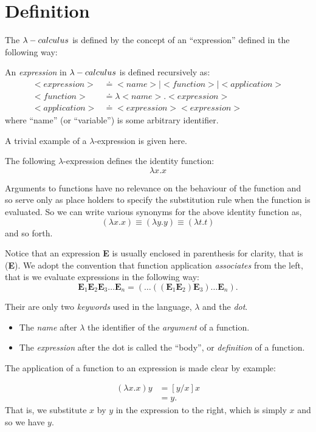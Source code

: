 
\section{Definition} %
\label{sec:definition}

The $\lambda-calculus$ is defined by the concept of an ``expression''
defined in the following way:

\begin{defn}[Expression]
	An \emph{expression} in $\lambda-calculus$ is defined recursively as:
	\begin{align*}
		<expression> & \doteq <name> | <function> | <application>
		\\
		<function> & \doteq \lambda <name>.<expression>
		\\
		<application> & \doteq <expression><expression>
	\end{align*}
	where ``name'' (or ``variable'') is some arbitrary identifier.
\end{defn}

A trivial example of a $\lambda$-expression is given here.

\begin{exmp}
	The following $\lambda$-expression defines the identity function:
	\[
		\lambda x.x
	\]
\end{exmp}

Arguments to functions have no relevance on the behaviour of the function
and so serve only as place holders to specify the substitution rule
when the function is evaluated. So we can write various synonyms for
the above identity function as,
\[
	(\lambda x.x) \equiv (\lambda y.y) \equiv (\lambda t.t)
\]
and so forth.

Notice that an expression \textbf{E} is usually enclosed in parenthesis
for clarity, that is (\textbf{E}). We adopt the convention that
function application \emph{associates} from the left, that is
we evaluate expressions in the following way:
\[
	\textbf{E}_1 \textbf{E}_2 \textbf{E}_3 \dots \textbf{E}_n
	= (\dots ((\textbf{E}_1 \textbf{E}_2) \textbf{E}_3) \dots \textbf{E}_n).
\]

\begin{defn}
	Their are only two \emph{keywords} used in the language,
	$\lambda$ and the \emph{dot}.
	\begin{itemize}
		\item The \emph{name} after $\lambda$ the identifier of the
			\emph{argument} of a function.
		\item The \emph{expression} after the dot is called the ``body'',
			or \emph{definition} of a function.
	\end{itemize}
\end{defn}

The application of a function to an expression is made clear by example:

\begin{exmp}
	\begin{align*}
		(\lambda x.x)y &= [y/x]x
		\\
		&= y.
	\end{align*}
	That is, we substitute $x$ by $y$ in the expression to the right, which
	is simply $x$ and so we have $y$.
\end{exmp}
